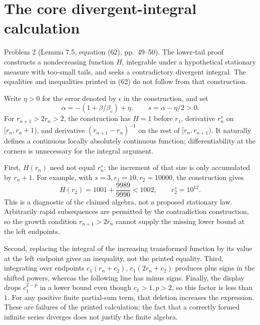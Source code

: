 \documentclass[10pt]{article}
\begin{document}
\section*{The core divergent-integral calculation}
Problem 2 (Lemma 7.5, equation (62), pp. 49–50).  The lower-tail proof constructs a nondecreasing function \(H\), integrable under a hypothetical stationary measure with too-small tails, and seeks a contradictory divergent integral. The equalities and inequalities printed in (62) do not follow from that construction.\par
Write \(\eta>0\) for the error denoted by \(\epsilon\) in the construction, and set \[\alpha=-(1+\beta/\beta_c)+\eta,\qquad s=\alpha-\eta/2>0.\] For \(r_{n+1}>2r_n>2\), the construction has \(H=1\) before \(r_1\), derivative \(r_n^s\) on \([r_n,r_n+1)\), and derivative \((r_{n+1}-r_n)^{-1}\) on the rest of \([r_n,r_{n+1})\). It naturally defines a continuous locally absolutely continuous function; differentiability at the corners is unnecessary for the integral argument.\par
First, \(H(r_n)\) need not equal \(r_n^s\); the increment of that size is only accumulated by \(r_n+1\). For example, with \(s=3,r_1=10,r_2=10000\), the construction gives \[H(r_2)=1001+\frac{9989}{9990}<1002,\qquad r_2^s=10^{12}.\] This is a diagnostic of the claimed algebra, not a proposed stationary law. Arbitrarily rapid subsequences are permitted by the contradiction construction, so the growth condition \(r_{n+1}>2r_n\) cannot supply the missing lower bound at the left endpoints.\par
Second, replacing the integral of the increasing transformed function by its value at the left endpoint gives an inequality, not the printed equality. Third, integrating over endpoints \(c_1(r_n+c_2)\), \(c_1(2r_n+c_2)\) produces plus signs in the shifted powers, whereas the following line has minus signs. Finally, the display drops \(c_1^{2-p}\) in a lower bound even though \(c_1>1,p>2\), so this factor is less than \(1\). For any positive finite partial-sum term, that deletion increases the expression. These are failures of the printed calculation; the fact that a correctly formed infinite series diverges does not justify the finite algebra.\par
\end{document}
